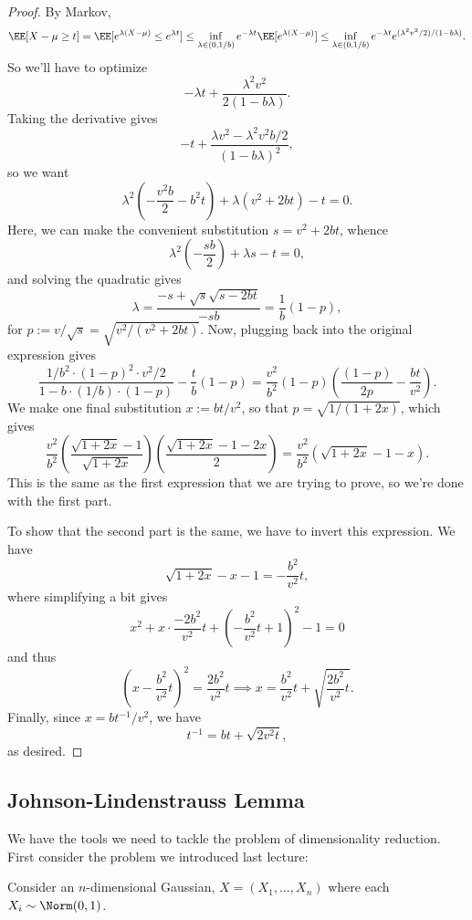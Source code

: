 \begin{proof}
By Markov, 
\[\EE[X-\mu\geq t] = \EE[e^{\lambda(X-\mu)}\leq e^{\lambda t}] \leq \inf_{\lambda \in (0,1/b)}e^{-\lambda t}\EE[e^{\lambda(X-\mu)}] \leq \inf_{\lambda\in (0,1/b)}e^{-\lambda t}e^{(\lambda^2 v^2/2)/(1-b\lambda)}.\] 
So we'll have to optimize
\[-\lambda t + \frac{\lambda^2 v^2}{2(1-b\lambda)}.\] 
Taking the derivative gives 
\[-t + \frac{\lambda v^2 - \lambda^2 v^2 b/2}{(1-b\lambda)^2},\] 
so we want 
\[\lambda^2\left(-\frac{v^2b}{2} - b^2t\right) + \lambda(v^2+2bt) - t = 0.\] 
Here, we can make the convenient substitution $s=v^2+2bt$, whence
\[\lambda^2\left(-\frac{sb}{2}\right) + \lambda s - t = 0,\] 
and solving the quadratic gives 
\[\lambda = \frac{-s + \sqrt{s}\sqrt{s-2bt}}{-sb} = \frac{1}{b}(1-p),\]
for $p := v/\sqrt{s} = \sqrt{v^2 / (v^2 + 2bt)}$. Now, plugging back into the original expression gives 
\[\frac{1/b^2\cdot (1-p)^2\cdot v^2/2}{1 - b\cdot (1/b)\cdot (1-p)} - \frac{t}{b}(1-p) = \frac{v^2}{b^2}(1-p)\left(\frac{(1-p)}{2p} - \frac{bt}{v^2}\right).\]
We make one final substitution $x:=bt/v^2$, so that $p=\sqrt{1/(1+2x)}$, which gives
\[\frac{v^2}{b^2}\left(\frac{\sqrt{1+2x}-1}{\sqrt{1+2x}}\right)\left(\frac{\sqrt{1+2x}-1-2x}{2}\right) = \frac{v^2}{b^2}(\sqrt{1+2x}-1-x).\]
This is the same as the first expression that we are trying to prove, so we're done with the first part.

To show that the second part is the same, we have to invert this expression. We have 
\[\sqrt{1+2x}-x-1 = -\frac{b^2}{v^2}t,\]
where simplifying a bit gives
\[x^2 + x\cdot \frac{-2b^2}{v^2}t + \left(-\frac{b^2}{v^2}t+1\right)^2-1=0\] 
and thus 
\[\left(x - \frac{b^2}{v^2}t\right)^2 = \frac{2b^2}{v^2}t\implies x = \frac{b^2}{v^2}t + \sqrt{\frac{2b^2}{v^2}t}.\]
Finally, since $x = bt^{-1}/v^2$, we have 
\[t^{-1} = bt + \sqrt{2v^2t},\]
as desired.
\end{proof}

\subsection{Johnson-Lindenstrauss Lemma}

We have the tools we need to tackle the problem of dimensionality reduction. First consider the problem we introduced last lecture: 
\begin{example}
\exlabel

Consider an $n$-dimensional Gaussian, $X=(X_1, \hdots, X_n)$ where each $X_i\sim \Norm(0,1)$. 
\end{example}

